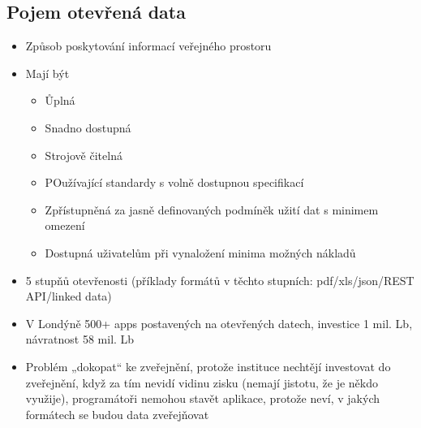 \subsection{Pojem otevřená data}
\begin{itemize}
    \item Způsob poskytování informací veřejného prostoru
    \item Mají být
    \begin{itemize}
        \item Ůplná
        \item Snadno dostupná
        \item Strojově čitelná
        \item POužívající standardy s volně dostupnou specifikací
        \item Zpřístupněná za jasně definovaných podmíněk užití dat s minimem omezení
        \item Dostupná uživatelům při vynaložení minima možných nákladů
    \end{itemize}
    \item 5 stupňů otevřenosti (příklady formátů v těchto stupních: pdf/xls/json/REST API/linked data)
    \item V Londýně 500+ apps postavených na otevřených datech, investice 1 mil. Lb, návratnost 58
mil. Lb
\item Problém „dokopat“ ke zveřejnění, protože instituce nechtějí investovat do zveřejnění, když za
tím nevidí vidinu zisku (nemají jistotu, že je někdo využije), programátoři nemohou stavět
aplikace, protože neví, v jakých formátech se budou data zveřejňovat


\end{itemize}
